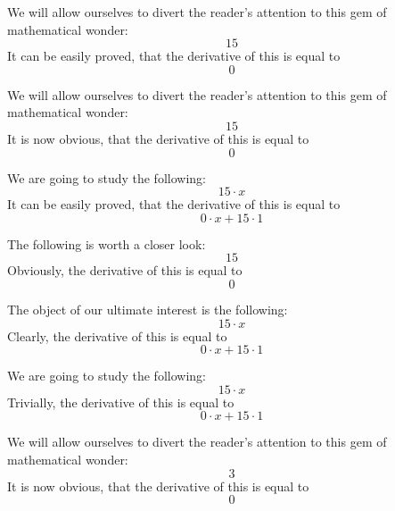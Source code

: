 \documentclass{article}
\begin{document}
We will allow ourselves to divert the reader's attention to this gem of mathematical wonder:
\begin{equation}
15 
\end{equation}
It can be easily proved, that the derivative of this is equal to
\begin{equation}
0 
\end{equation}

We will allow ourselves to divert the reader's attention to this gem of mathematical wonder:
\begin{equation}
15 
\end{equation}
It is now obvious, that the derivative of this is equal to
\begin{equation}
0 
\end{equation}

We are going to study the following:
\begin{equation}
15 \cdot x 
\end{equation}
It can be easily proved, that the derivative of this is equal to
\begin{equation}
0 \cdot x + 15 \cdot 1 
\end{equation}

The following is worth a closer look:
\begin{equation}
15 
\end{equation}
Obviously, the derivative of this is equal to
\begin{equation}
0 
\end{equation}

The object of our ultimate interest is the following:
\begin{equation}
15 \cdot x 
\end{equation}
Clearly, the derivative of this is equal to
\begin{equation}
0 \cdot x + 15 \cdot 1 
\end{equation}

We are going to study the following:
\begin{equation}
15 \cdot x 
\end{equation}
Trivially, the derivative of this is equal to
\begin{equation}
0 \cdot x + 15 \cdot 1 
\end{equation}

We will allow ourselves to divert the reader's attention to this gem of mathematical wonder:
\begin{equation}
3 
\end{equation}
It is now obvious, that the derivative of this is equal to
\begin{equation}
0 
\end{equation}
\end{document}
